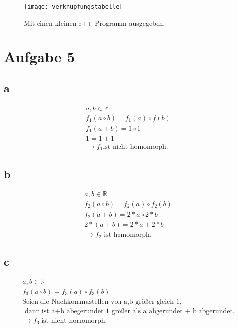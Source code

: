 \documentclass[]{article}
\begin{document}
\begin{figure}

	\texttt{[image: verknüpfungstabelle]}
	\caption{Mit einen kleinen c++ Programm ausgegeben.}
	\label{fig:verknupfungstabelle}
\end{figure}

\newpage

\section{Aufgabe 5}
\subsection*{a}
\begin{gather*}
a,b \in \mathbb{Z } \\
f_1(a \circ b) = f_1(a) \circ f(b) \\
f_1 (a+b) = 1 \circ 1 \\
1 = 1+1 \\
\rightarrow f_1 \text{ist nicht  homomorph.}
\end{gather*}
\subsection{b}
\begin{gather*}
a,b \in \mathbb{R}\\
f_2(a \circ b) = f_2(a) \circ f_2(b)\\
f_2(a+b) = 2*a \circ 2*b \\
2*(a+b) = 2*a + 2*b\\
\rightarrow f_2\text{ ist homomorph.}
\end{gather*}
\subsection{c}
\begin{gather*}
 a,b \in \mathbb{R}\\
 f_3(a \circ b) = f_3(a) \circ f_3(b)\\
	 \text{Seien die Nachkommastellen von a,b größer gleich 1,}\\\text{ dann ist a+b abegerundet 1 größer als a abgerundet 
 	+ b abgerundet.}\\
 \rightarrow f_3 \text{ ist nicht homomorph.}
 \end{gather*}
\end{document}
